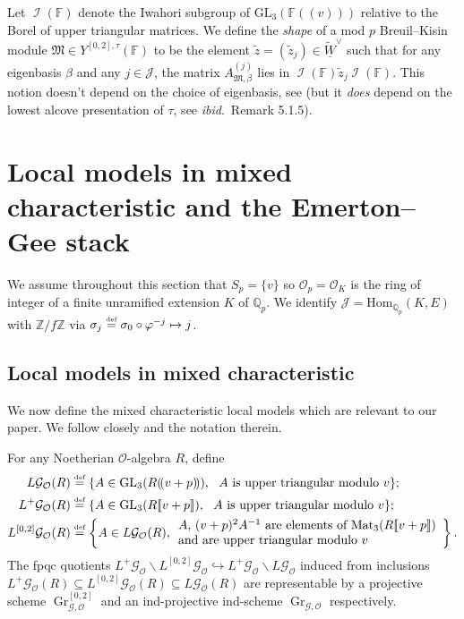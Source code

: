 \documentclass[oneside,a4paper,english, 11pt]{amsart}
\theoremstyle{plain}
\theoremstyle{plain}
\theoremstyle{plain}
\theoremstyle{plain}
\theoremstyle{plain}
\theoremstyle{plain}
\theoremstyle{definition}
\theoremstyle{definition}
\theoremstyle{definition}
\theoremstyle{remark}
\numberwithin{equation}{section}
\newcommand{\Z}{\mathbb{Z}}
\newcommand{\Qp}{\mathbb{Q}_p}
\newcommand{\F}{\mathbb{F}}
\newcommand{\fM}{\mathfrak{M}}
\newcommand{\cG}{\mathcal{G}}
\newcommand{\cI}{\mathcal{I}}
\newcommand{\cJ}{\mathcal{J}}
\newcommand{\cO}{\mathcal{O}}
\newcommand{\phz}{\varphi}
\newcommand{\Hom}{\mathrm{Hom}}
\newcommand{\GL}{\mathrm{GL}}
\newcommand{\un}[1]{\underline{#1}}
\newcommand{\tld}[1]{\widetilde{#1}}
\newcommand{\defeq}{\stackrel{\textrm{\tiny{def}}}{=}}
\DeclareMathOperator{\Mat}{Mat}
\DeclareMathOperator{\Gr}{Gr}
\DeclareMathOperator{\Iw}{\cI}
\newcommand{\into}{\hookrightarrow}
\begin{document}
Let $\Iw(\F)$ denote the Iwahori subgroup of $\GL_3(\F(\!(v)\!))$ relative to the Borel of upper triangular matrices.
We define the \emph{shape} of a mod $p$ Breuil--Kisin module $\fM \in Y^{[0,2], \tau}(\F)$ to be the element $\tld{z} = (\widetilde{z}_j) \in \widetilde{\un{W}}^{\vee}$ such that for any eigenbasis $\beta$ and any $j \in \cJ$, the matrix $A^{(j)}_{\fM, \beta}$ lies in $\Iw(\F) \widetilde{z}_j \Iw(\F)$.
This notion doesn't depend on the choice of eigenbasis, see \cite[Proposition 5.1.8]{MLM} (but it \emph{does} depend on the lowest alcove presentation of $\tau$, see \emph{ibid}.~Remark 5.1.5).
%


\section{Local models in mixed characteristic and the Emerton--Gee stack}
\label{sec:LM:EG}


We assume throughout this section that $S_p=\{v\}$ so $\cO_p=\cO_K$ is the ring of integer of a finite unramified extension $K$ of $\Qp$.  We identify $\cJ=\Hom_{\Qp}(K,E)$ with $\Z/f\Z$ via $\sigma_{j} \defeq \sigma_0 \circ \phz^{-j} \mapsto j$.


\subsection{Local models in mixed characteristic}\label{sec:localmodel}

We now define the mixed characteristic local models which are relevant to our paper.
We follow closely \cite[\S 4]{MLM} and the notation therein.

For any Noetherian $\cO$-algebra $R$, define 
\begin{align*}
L \cG_{\cO}(R)&\defeq \{A \in \GL_3(R(\!(v+p)\!)),\ \text{ $A$ is upper triangular modulo $v$}\};\\
L^+\cG_{\cO}(R)&\defeq \{A \in \GL_3(R[\![v+p]\!]),\ \text{ $A$ is upper triangular modulo $v$}\};
\\
L^{[0,2]} \cG_{\cO}(R)&\defeq \left\{
A \in L \cG_{\cO}(R),
\begin{array}{l}
\text{$A$, $(v+p)^2A^{-1}$ are elements of $\Mat_3(R[\![v+p]\!])$}
\\ 
\text{and are upper triangular modulo $v$}
\end{array}\right\}.
\end{align*}
%
The fpqc quotients $L^+\cG_{\cO} \backslash L^{[0,2]}\cG_{\cO}\into L^+\cG_{\cO}\backslash L\cG_{\cO}$ induced from inclusions $L^+\cG_{\cO}(R)\subseteq L^{[0,2]} \cG_{\cO}(R)\subseteq L \cG_{\cO}(R)$ are representable by a projective scheme $\Gr^{[0,2]}_{\cG,\cO}$ and an ind-projective ind-scheme $\Gr_{\cG,\cO}$ respectively.
\end{document}
